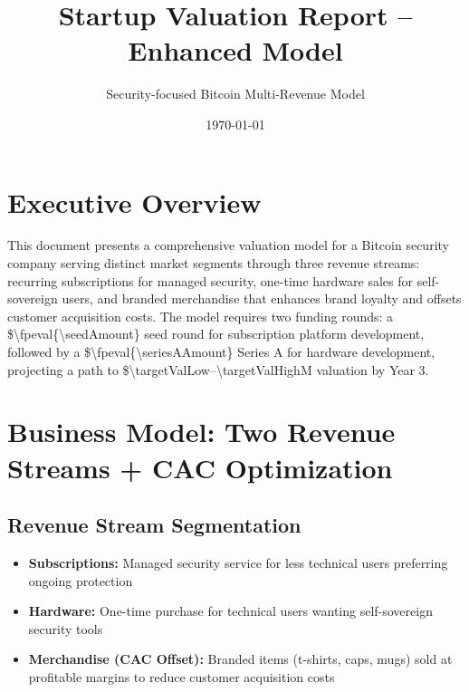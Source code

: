 \documentclass[11pt]{article}
\newcommand{\numint}[1]{\num[round-precision=0]{\fpeval{#1}}}
\begin{document}
\title{Startup Valuation Report -- Enhanced Model}
\author{Security-focused Bitcoin Multi-Revenue Model}
\date{\today}
\maketitle

\section*{Executive Overview}
This document presents a comprehensive valuation model for a Bitcoin security company serving distinct market segments through three revenue streams: recurring subscriptions for managed security, one-time hardware sales for self-sovereign users, and branded merchandise that enhances brand loyalty and offsets customer acquisition costs. The model requires two funding rounds: a \$\numint{\seedAmount} seed round for subscription platform development, followed by a \$\numint{\seriesAAmount} Series A for hardware development, projecting a path to \$\num{\targetValLow}--\num{\targetValHigh}M valuation by Year 3.

\section{Business Model: Two Revenue Streams + CAC Optimization}

\subsection{Revenue Stream Segmentation}
\begin{itemize}
  \item \textbf{Subscriptions:} Managed security service for less technical users preferring ongoing protection
  \item \textbf{Hardware:} One-time purchase for technical users wanting self-sovereign security tools
  \item \textbf{Merchandise (CAC Offset):} Branded items (t-shirts, caps, mugs) sold at profitable margins to reduce customer acquisition costs
\end{itemize}
\end{document}
